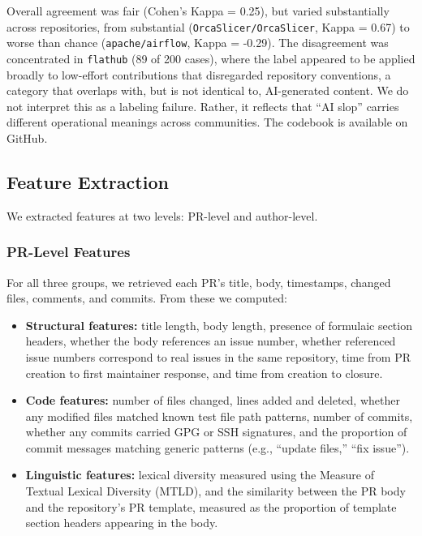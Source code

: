 \documentclass[11pt]{article}
\begin{document}
	Overall agreement was fair (Cohen's Kappa = 0.25), but varied substantially across repositories, from substantial (\texttt{OrcaSlicer/OrcaSlicer}, Kappa = 0.67) to worse than chance (\texttt{apache/airflow}, Kappa = -0.29). The disagreement was concentrated in \texttt{flathub} (89 of 200 cases), where the label appeared to be applied broadly to low-effort contributions that disregarded repository conventions, a category that overlaps with, but is not identical to, AI-generated content. We do not interpret this as a labeling failure. Rather, it reflects that ``AI slop'' carries different operational meanings across communities. The codebook is available on GitHub.
	\subsection{Feature Extraction}
	
	We extracted features at two levels: PR-level and author-level.
	
	\subsubsection{PR-Level Features}
	
	For all three groups, we retrieved each PR's title, body, timestamps, changed files, comments, and commits. From these we computed:
	
	\begin{itemize}
		\item \textbf{Structural features:} title length, body length, presence of formulaic section headers, whether the body references an issue number, whether referenced issue numbers correspond to real issues in the same repository, time from PR creation to first maintainer response, and time from creation to closure.
		
		\item \textbf{Code features:} number of files changed, lines added and deleted, whether any modified files matched known test file path patterns, number of commits, whether any commits carried GPG or SSH signatures, and the proportion of commit messages matching generic patterns (e.g., ``update files,'' ``fix issue'').
		
		\item \textbf{Linguistic features:} lexical diversity measured using the Measure of Textual Lexical Diversity (MTLD), and the similarity between the PR body and the repository's PR template, measured as the proportion of template section headers appearing in the body.
	\end{itemize}
	
\end{document}
